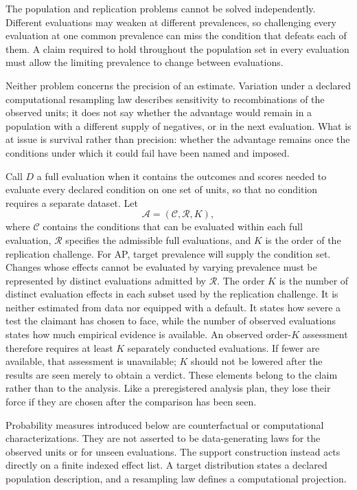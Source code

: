 \documentclass[11pt]{article}
\newcommand{\Regime}{\mathcal{R}}
\newcommand{\Assess}{\mathcal{A}}
\newcommand{\CSet}{\mathcal{C}}
\theoremstyle{remark}
\begin{document}
The population and replication problems cannot be solved independently.
Different evaluations may weaken at different prevalences, so challenging every
evaluation at one common prevalence can miss the condition that defeats each of
them. A claim required to hold throughout the population set in every
evaluation must allow the limiting prevalence to change between evaluations.

Neither problem concerns the precision of an estimate. Variation under a
declared computational resampling law describes sensitivity to recombinations
of the observed units; it does not say whether the advantage would remain in a
population with a different supply of negatives, or in the next evaluation.
What is at issue is survival rather than precision: whether the advantage
remains once the conditions under which it could fail have been named and
imposed.

Call $D$ a full evaluation when it contains the outcomes and scores needed to
evaluate every declared condition on one set of units, so that no condition
requires a separate dataset. Let
\[
\Assess=(\CSet,\Regime,K),
\]
where $\CSet$ contains the conditions that can be evaluated within each full
evaluation, $\Regime$ specifies the admissible full evaluations, and $K$ is
the order of the replication challenge. For AP, target prevalence will supply
the condition set. Changes whose effects cannot be evaluated by varying
prevalence must be represented by distinct evaluations admitted by $\Regime$.
The order $K$ is the number of distinct evaluation effects in each subset
used by the replication challenge. It is neither estimated from data nor
equipped with a default. It states how severe a test the claimant has chosen
to face, while the number of observed evaluations states how much empirical
evidence is available. An observed order-$K$ assessment therefore requires at
least $K$ separately conducted evaluations. If fewer are available, that
assessment is unavailable; $K$ should not be lowered after the results are
seen merely to obtain a verdict.
These elements belong to the claim rather than to the analysis. Like a
preregistered analysis plan, they lose their force if they are chosen after the
comparison has been seen.

Probability measures introduced below are counterfactual or computational
characterizations. They are not asserted to be data-generating laws for the
observed units or for unseen evaluations. The support construction instead
acts directly on a finite indexed effect list. A target distribution states a
declared population description, and a resampling law defines a computational
projection.
\end{document}
